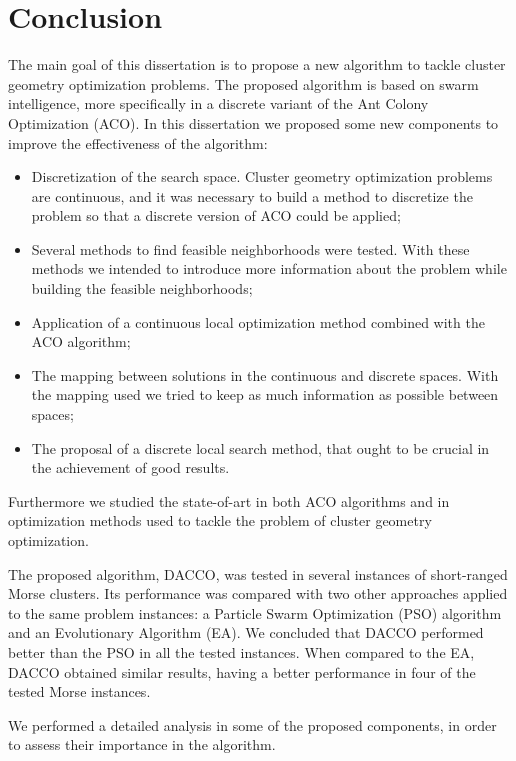 \chapter{Conclusion}
\label{chap:conclusions}


The main goal of this dissertation is to propose a new algorithm to tackle cluster geometry optimization problems. The proposed algorithm is based on swarm intelligence, more specifically in a discrete variant of the Ant Colony Optimization (ACO). In this dissertation we proposed some new components to improve the effectiveness of the algorithm:
\begin{itemize}
	\item Discretization of the search space. Cluster geometry optimization problems are continuous, and it was necessary to build a method to discretize the problem so that a discrete version of ACO could be applied;
	\item Several methods to find feasible neighborhoods were tested. With these methods we intended to introduce more information about the problem while building the feasible neighborhoods;
	\item Application of a continuous local optimization method combined with the ACO algorithm;
	\item The mapping between solutions in the continuous and discrete spaces. With the mapping used we tried to keep as much information as possible between spaces;
	\item The proposal of a discrete local search method, that ought to be crucial in the achievement of good results.
\end{itemize}

Furthermore we studied the state-of-art in both ACO algorithms and in optimization methods used to tackle the problem of cluster geometry optimization.

The proposed algorithm, DACCO, was tested in several instances of short-ranged Morse clusters. Its performance was compared with two other approaches applied to the same problem instances: a Particle Swarm Optimization (PSO) algorithm and an Evolutionary Algorithm (EA). We concluded that DACCO performed better than the PSO in all the tested instances. When compared to the EA, DACCO obtained similar results, having a better performance in four of the tested Morse instances.

We performed a detailed analysis in some of the proposed components, in order to assess their importance in the algorithm.

